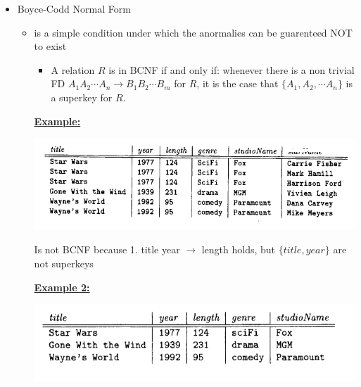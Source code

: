 \documentclass[12pt]{article}
\begin{document}
\begin{enumerate}[1.]
\begin{enumerate}[a)]
\begin{itemize}
\begin{itemize}
\begin{itemize}
                \end{itemize}
            \end{itemize}

            \item Boyce-Codd Normal Form
            \begin{itemize}
                \item is a simple condition under which the anormalies can be
                guarenteed NOT to exist

                \bigskip

                \begin{itemize}
                    \item A relation $R$ is in BCNF if and only if: whenever there is a
                    non trivial FD $A_1A_2 \cdots A_n \to B_1 B_2 \cdots B_m$ for $R$,
                    it is the case that $\{A_1, A_2, \cdots A_n\}$ is a superkey for $R$.
                \end{itemize}

                \bigskip

                \underline{\textbf{Example:}}

                \begin{center}
                \includegraphics[width=0.7\linewidth]{images/worksheet_12_solution_4.png}
                \end{center}

                \bigskip

                Is not BCNF because 1. title year $\to$ length holds, but $\{title, year\}$
                are not superkeys

                \bigskip

                \underline{\textbf{Example 2:}}

                \bigskip

                \begin{center}
                \includegraphics[width=0.7\linewidth]{images/worksheet_12_solution_5.png}
                \end{center}


\end{itemize}
\end{itemize}
\end{enumerate}
\end{enumerate}
\end{document}
